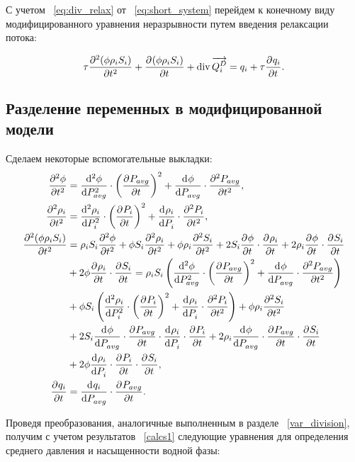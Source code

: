 С учетом ~\eqref{eq:div_relax} от ~\eqref{eq:short_system} перейдем к конечному виду модифицированного уравнения неразрывности
путем введения релаксации потока:

\begin{equation} \label{eq:mod_system}
  \tau \pd[2]{(\phi \rho_i S_i)}{t} + \pd{(\phi \rho_i S_i)}{t} + \diver{ \overrightarrow{Q_i^D}} = q_i + \tau \pd{q_i}{t}.
\end{equation}



\subsection{Разделение переменных в модифицированной модели}

Сделаем некоторые вспомогательные выкладки:
\begin{equation} \label{calcs1}
 \begin{aligned}
  \pd[2]{\phi}{t} &= \dd[2]{\phi}{P_{avg}} \cdot {\left( \pd{P_{avg}}{t}\right) }^2 + \dd{\phi}{P_{avg}} \cdot \pd[2]{P_{avg}}{t}, \\
  \pd[2]{\rho_i}{t} &= \dd[2]{\rho_i}{P_i} \cdot {\left( \pd{P_i}{t}\right) }^2 + \dd{\rho_i}{P_i} \cdot \pd[2]{P_i}{t}, \\
  \pd[2]{(\phi \rho_i S_i)}{t} &= \rho_i S_i \pd[2]{\phi}{t} + \phi S_i \pd[2]{\rho_i}{t} + \phi \rho_i \pd[2]{S_i}{t} +
  2S_i \pd{\phi}{t} \cdot \pd{\rho_i}{t} + 2\rho_i \pd{\phi}{t} \cdot \pd{S_i}{t} \\
  &+ 2\phi \pd{\rho_i}{t} \cdot \pd{S_i}{t} = \rho_i S_i \left(  \dd[2]{\phi}{P_{avg}} \cdot {\left( \pd{P_{avg}}{t}\right) }^2 + \dd{\phi}{P_{avg}} \cdot \pd[2]{P_{avg}}{t} \right) \\
  &+ \phi S_i \left( \dd[2]{\rho_i}{P_i} \cdot {\left( \pd{P_i}{t}\right) }^2 + \dd{\rho_i}{P_i} \cdot \pd[2]{P_i}{t} \right) + \phi \rho_i \pd[2]{S_i}{t} \\
  &+ 2S_i \dd{\phi}{P_{avg}} \cdot \pd{P_{avg}}{t} \cdot \dd{\rho_i}{P_i} \cdot \pd{P_i}{t} + 2\rho_i \dd{\phi}{P_{avg}} \cdot \pd{P_{avg}}{t} \cdot \pd{S_i}{t} \\
  &+ 2\phi \dd{\rho_i}{P_i} \cdot \pd{P_i}{t} \cdot \pd{S_i}{t}, \\
  \pd{q_i}{t} &= \dd{q_i}{P_{avg}} \cdot \pd{P_{avg}}{t}.
 \end{aligned}
\end{equation}

Проведя преобразования, аналогичные выполненным в разделе ~\ref{var_division}, получим с учетом результатов ~\eqref{calcs1} следующие уравнения для определения
среднего давления и насыщенности водной фазы:

